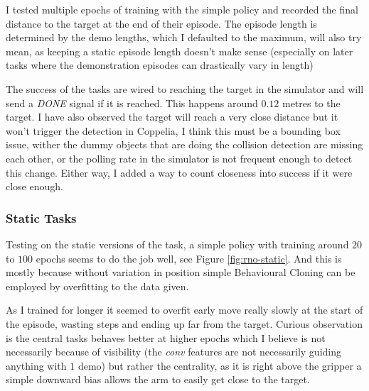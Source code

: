 I tested multiple epochs of training with the simple policy and recorded the final distance to the target at the end of their episode. The episode length is determined by the demo lengths, which I defaulted to the maximum, will also try mean, as keeping a static episode length doesn't make sense (especially on later tasks where the demonstration episodes can drastically vary in length)

The success of the tasks are wired to reaching the target in the simulator and will send a \emph{DONE} signal if it is reached. This happens around $0.12$ metres to the target. I have also observed the target will reach a very close distance but it won't trigger the detection in Coppelia, I think this must be a bounding box issue, wither the dummy objects that are doing the collision detection are missing each other, or the polling rate in the simulator is not frequent enough to detect this change. Either way, I added a way to count closeness into success if it were close enough.

\subsubsection{Static Tasks}
Testing on the static versions of the task, a simple policy with training around $20$ to $100$ epochs seems to do the job well, see Figure \ref{fig:rno-static}. And this is mostly because without variation in position simple Behavioural Cloning can be employed by overfitting to the data given. 

As I trained for longer it seemed to overfit early move really slowly at the start of the episode, wasting steps and ending up far from the target. Curious observation is \todo[color=purple]{} the central tasks behaves better at higher epochs which I believe is not necessarily because of visibility (the \emph{conv} features are not necessarily guiding anything with $1$ demo) but rather the centrality, as it is right above the gripper a simple downward bias allows the arm to easily get close to the target.

